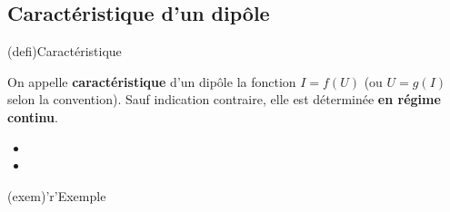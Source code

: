 \documentclass[../../main/main.tex]{subfiles}
\begin{document}
\subsection{Caractéristique d'un dipôle}
\begin{tcbraster}[raster columns=2, raster equal height=rows]
	\begin{tcb}[label=def:dipcara](defi){Caractéristique}

		On appelle \textbf{caractéristique} d'un dipôle la fonction $I = f(U)$
		(ou $U = g(I)$ selon la convention). Sauf indication contraire, elle est
		déterminée \textbf{en régime continu}.

		\begin{itemize}
			\item {}
			\item {}
		\end{itemize}
	\end{tcb}
	\begin{tcb}[label=exem:dipcara](exem)'r'{Exemple}
		\begin{center}
\end{center}
\end{tcb}
\end{tcbraster}
\end{document}
